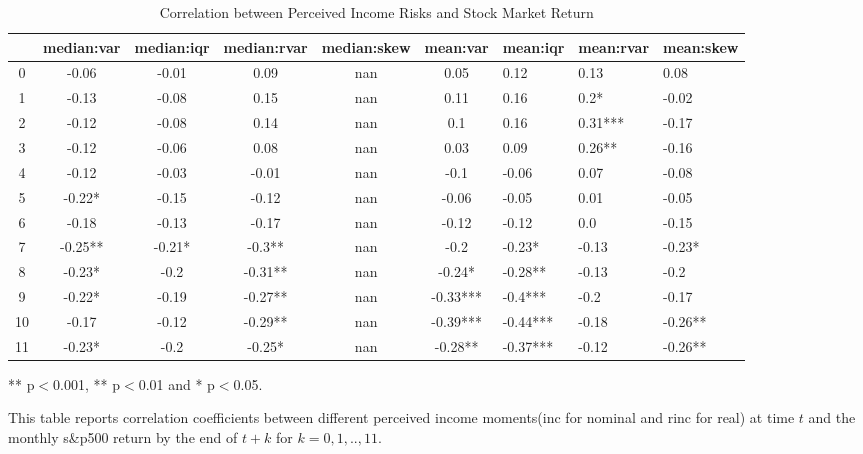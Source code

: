
\begin{table}[ht]
\centering
\begin{adjustbox}{width={\textwidth}}
\begin{threeparttable}
\caption{Correlation between Perceived Income Risks and Stock Market Return}
\label{macro_corr}
\begin{tabular}{cccccclll}
\toprule
{} & median:var & median:iqr & median:rvar & median:skew &  mean:var &  mean:iqr & mean:rvar & mean:skew \\
\midrule
0  &      -0.06 &      -0.01 &        0.09 &         nan &      0.05 &      0.12 &      0.13 &      0.08 \\
1  &      -0.13 &      -0.08 &        0.15 &         nan &      0.11 &      0.16 &      0.2* &     -0.02 \\
2  &      -0.12 &      -0.08 &        0.14 &         nan &       0.1 &      0.16 &   0.31*** &     -0.17 \\
3  &      -0.12 &      -0.06 &        0.08 &         nan &      0.03 &      0.09 &    0.26** &     -0.16 \\
4  &      -0.12 &      -0.03 &       -0.01 &         nan &      -0.1 &     -0.06 &      0.07 &     -0.08 \\
5  &     -0.22* &      -0.15 &       -0.12 &         nan &     -0.06 &     -0.05 &      0.01 &     -0.05 \\
6  &      -0.18 &      -0.13 &       -0.17 &         nan &     -0.12 &     -0.12 &       0.0 &     -0.15 \\
7  &    -0.25** &     -0.21* &      -0.3** &         nan &      -0.2 &    -0.23* &     -0.13 &    -0.23* \\
8  &     -0.23* &       -0.2 &     -0.31** &         nan &    -0.24* &   -0.28** &     -0.13 &      -0.2 \\
9  &     -0.22* &      -0.19 &     -0.27** &         nan &  -0.33*** &   -0.4*** &      -0.2 &     -0.17 \\
10 &      -0.17 &      -0.12 &     -0.29** &         nan &  -0.39*** &  -0.44*** &     -0.18 &   -0.26** \\
11 &     -0.23* &       -0.2 &      -0.25* &         nan &   -0.28** &  -0.37*** &     -0.12 &   -0.26** \\
\bottomrule
\end{tabular}
\begin{tablenotes}
\item *** p$<$0.001, ** p$<$0.01 and * p$<$0.05.
\item This table reports correlation coefficients between different perceived income moments(inc for nominal
and rinc for real) at time
$t$ and the monthly s\&p500 return by the end of $t+k$ for $k=0,1,..,11$.
\end{tablenotes}
\end{threeparttable}
\end{adjustbox}
\end{table}
